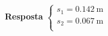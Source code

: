 
\textbf{Resposta}
$
\begin{cases}
	s_{1}=\SI{0.142}{\meter}\\
	s_{2}=\SI{0.067}{\meter}\\
\end{cases}
$